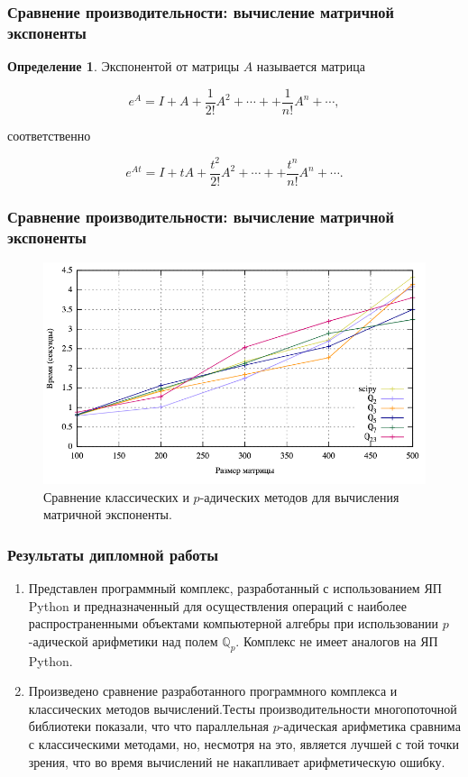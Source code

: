 \documentclass[10pt,professionalfont,utf8,presentation,compress]{beamer}
\theoremstyle{definition}
\newtheorem{defn}{Определение}
\theoremstyle{plain}
\begin{document}
\begin{frame}
\frametitle{Сравнение производительности: вычисление матричной экспоненты}
\begin{defn}\label{def:exp}
Экспонентой от матрицы $A$ называется матрица

\begin{equation}
e^A=I+A+\frac{1}{2!}A^2+\cdots++\frac{1}{n!}A^n + \cdots,
\end{equation}

\noindent соответственно

\begin{equation}
e^{At}=I+tA+\frac{t^2}{2!}A^2+\cdots++\frac{t^n}{n!}A^n + \cdots.
\end{equation}
\end{defn}
\end{frame}


\begin{frame}
\frametitle{Сравнение производительности: вычисление матричной экспоненты}
\begin{figure}[H]
\centerline{\includegraphics[width=0.95\linewidth]{../gnuplot/exp/plotfix.png}}
\caption{Сравнение классических и $p$-адических методов для вычисления матричной экспоненты.}
\label{img:exp:plot}
\end{figure}
\end{frame}


\begin{frame}
    \frametitle{Результаты дипломной работы}
    \begin{enumerate}
        \item Представлен программный комплекс, разработанный с использованием ЯП Python и предназначенный для осуществления операций с наиболее распространенными объектами компьютерной алгебры при использовании $p$-адической арифметики над полем $\mathbb{Q}_p$. Комплекс не имеет аналогов на ЯП Python.
        \item Произведено сравнение разработанного программного комплекса и классических методов вычислений.Тесты производительности многопоточной библиотеки показали, что что параллельная $p$-адическая арифметика сравнима с классическими методами, но, несмотря на это, является лучшей с той точки зрения, что во время вычислений не накапливает арифметическую ошибку.
    \end{enumerate}    
\end{frame}
\end{document}
